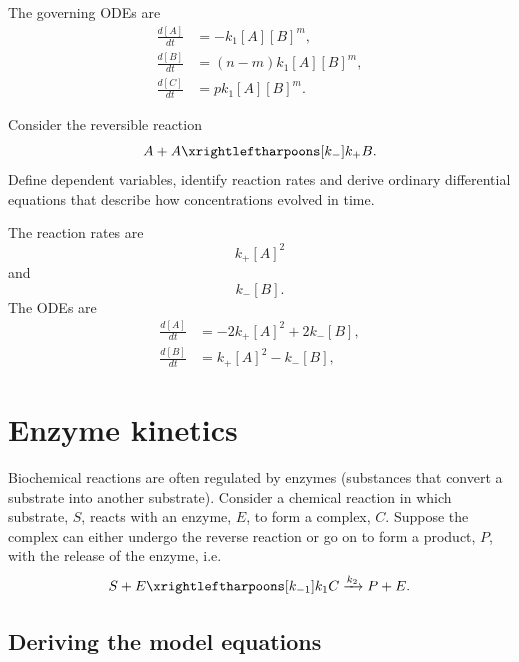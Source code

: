 \documentclass[
  letterpaper,
  DIV=11,
  numbers=noendperiod]{scrreprt}
\begin{document}
The governing ODEs are \[
\begin{aligned}
\frac{d[A]}{dt}&=-k_1[A][B]^m, \nonumber\\
\frac{d[B]}{dt}&=(n-m)k_1[A][B]^m, \nonumber\\
\frac{d[C]}{dt}&=pk_1[A][B]^m.  \nonumber
\end{aligned}
\]

\begin{tcolorbox}[enhanced jigsaw, bottomtitle=1mm, rightrule=.15mm, colback=white, leftrule=.75mm, title=\textcolor{quarto-callout-note-color}{\faInfo}\hspace{0.5em}{Note}, bottomrule=.15mm, coltitle=black, toptitle=1mm, breakable, colframe=quarto-callout-note-color-frame, titlerule=0mm, toprule=.15mm, opacitybacktitle=0.6, arc=.35mm, colbacktitle=quarto-callout-note-color!10!white, left=2mm, opacityback=0]

Consider the reversible reaction \[
A+A  \xrightleftharpoons[k_{-}]{k_{+}}  B.
\] Define dependent variables, identify reaction rates and derive
ordinary differential equations that describe how concentrations evolved
in time.

The reaction rates are \[
k_+[A]^2
\] and \[
k_- [B].
\] The ODEs are \[
\begin{aligned}
\frac{d[A]}{dt}&=-2k_+[A]^2+2k_- [B] , \nonumber\\
\frac{d[B]}{dt}&=k_+[A]^2-k_- [B], 
\end{aligned}
\]

\end{tcolorbox}

\hypertarget{enzyme-kinetics}{%
\section{Enzyme kinetics}\label{enzyme-kinetics}}

Biochemical reactions are often regulated by enzymes (substances that
convert a substrate into another substrate). Consider a chemical
reaction in which substrate, \(S\), reacts with an enzyme, \(E\), to
form a complex, \(C\). Suppose the complex can either undergo the
reverse reaction or go on to form a product, \(P\), with the release of
the enzyme, i.e. \[
S+E  \xrightleftharpoons[k_{-1}]{k_{1}}  C \xrightarrow{k_2} P+E .
\]

\hypertarget{deriving-the-model-equations}{%
\subsection{Deriving the model
equations}\label{deriving-the-model-equations}}
\end{document}
